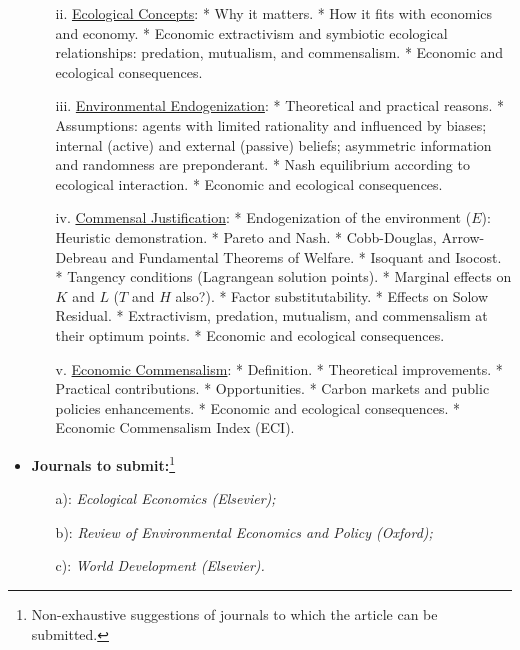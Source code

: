 \begin{itemize}
\begin{itemize}
            \item[ii.] \underline{Ecological Concepts}: * Why it matters. * How it fits with economics and economy. * Economic extractivism and symbiotic ecological relationships: predation, mutualism, and commensalism. * Economic and ecological consequences.  
            \item[iii.] \underline{Environmental Endogenization}: * Theoretical and practical reasons. * Assumptions: agents with limited rationality and influenced by biases; internal (active) and external (passive) beliefs; asymmetric information and randomness are preponderant. * Nash equilibrium according to ecological interaction. * Economic and ecological consequences. 
            
            \item[iv.] \underline{Commensal Justification}: * Endogenization of the environment (\(E\)): Heuristic demonstration. * Pareto and Nash. * Cobb-Douglas, Arrow-Debreau and Fundamental Theorems of Welfare. * Isoquant and Isocost. * Tangency conditions (Lagrangean solution points). * Marginal effects on \(K\) and \(L\) (\(T\) and \(H\) also?). * Factor substitutability. * Effects on Solow Residual. * Extractivism, predation, mutualism, and commensalism at their optimum points. * Economic and ecological consequences.
            
            \item[v.] \underline{Economic Commensalism}: * Definition. * Theoretical improvements. * Practical contributions. * Opportunities. * Carbon markets and public policies enhancements. * Economic and ecological consequences. * Economic Commensalism Index (ECI).
            
        \end{itemize}
    
    \item \textbf{Journals to submit:}\footnote{Non-exhaustive suggestions of journals to which the article can be submitted.}
        
        \begin{itemize}
            
            \item[a):] \textit{Ecological Economics (Elsevier);}
            \item[b):] 	\textit{Review of Environmental Economics and Policy (Oxford);}
            \item[c):] 	\textit{World Development (Elsevier).}
        
        \end{itemize}

\end{itemize}

